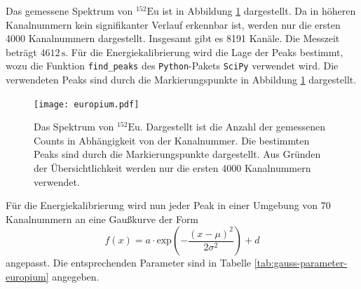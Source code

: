 Das gemessene Spektrum von $^{152}\text{Eu}$ ist in Abbildung \ref{fig:europium-spektrum} dargestellt.
Da in höheren Kanalnummern kein signifikanter Verlauf erkennbar ist, werden nur die ersten 4000 Kanalnummern
dargestellt.
Insgesamt gibt es 8191 Kanäle. Die Messzeit beträgt $4612 \, \text{s}$.
Für die Energiekalibrierung wird die Lage der Peaks bestimmt, wozu die Funktion \texttt{find\_peaks}
des \texttt{Python}-Pakets \texttt{SciPy} \cite{Scipy} verwendet wird. 
Die verwendeten Peaks sind durch die Markierungspunkte in Abbildung \ref{fig:europium-spektrum} dargestellt.
\FloatBarrier
\begin{figure}
\centering
\texttt{[image: europium.pdf]}
\caption{Das Spektrum von $^{152}\text{Eu}$. Dargestellt ist die Anzahl der gemessenen Counts in Abhängigkeit von der Kanalnummer.
        Die bestimmten Peaks sind durch die Markierungspunkte dargestellt.
        Aus Gründen der Übersichtlichkeit werden nur die ersten 4000 Kanalnummern verwendet.}
\label{fig:europium-spektrum}
\end{figure}
\FloatBarrier
Für die Energiekalibrierung wird nun jeder Peak in einer Umgebung von 70 Kanalnummern 
an eine Gaußkurve der Form
\begin{equation}
    \label{eq:gaussfit}
    f(x) = a \cdot \text{exp}\left(-\frac{\left(x - \mu\right)^2}{2\sigma^2}\right) + d
\end{equation}
angepasst.
Die entsprechenden Parameter sind in Tabelle \ref{tab:gauss-parameter-europium} angegeben.
